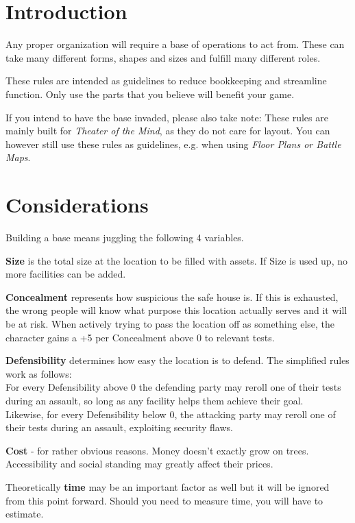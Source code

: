 \documentclass[12pt,a4paper,openany,usenames,dvipsnames]{book}
\begin{document}
	

	\chapter{Introduction}
	Any proper organization will require a base of operations to act from.
	These can take many different forms, shapes and sizes and fulfill many different roles.
	\par
	These rules are intended as guidelines to reduce bookkeeping and streamline function.
	Only use the parts that you believe will benefit your game.
	\par
	If you intend to have the base invaded, please also take note:
	These rules are mainly built for \emph{Theater of the Mind}, as they do not care for layout.
	You can however still use these rules as guidelines, e.g. when using \emph{Floor Plans or Battle Maps}.

	\chapter{Considerations}
	\vspace*{-10mm}
	Building a base means juggling the following 4 variables.\par
	\textbf{Size} is the total size at the location to be filled with assets.
		If Size is used up, no more facilities can be added.\par
	\textbf{Concealment} represents how suspicious the safe house is.
		If this is exhausted, the wrong people will know what purpose this location actually serves and it will be at risk.
		When actively trying to pass the location off as something else,
			the character gains a +5 per Concealment above 0 to relevant tests.\par
	\textbf{Defensibility} determines how easy the location is to defend.
		The simplified rules work as follows:\\
		For every Defensibility above 0 the defending party may reroll one of their tests during an assault,
			so long as any facility helps them achieve their goal.\\
		Likewise, for every Defensibility below 0,
			the attacking party may reroll one of their tests during an assault,
			exploiting security flaws.\par
	\textbf{Cost} - for rather obvious reasons.
		Money doesn't exactly grow on trees.
		Accessibility and social standing may greatly affect their prices.\par
	Theoretically \textbf{time} may be an important factor as well but it will be ignored from this point forward.
		Should you need to measure time, you will have to estimate.
\end{document}
